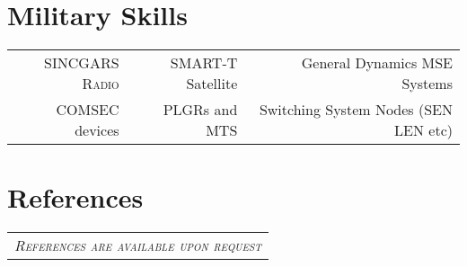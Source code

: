 \documentclass[a4paper,10pt]{article}
\newcommand{\fivenotes}{%
\textcolor{noteone}{\symbol{"2022}}
\textcolor{notetwo}{\symbol{"2022}}
\textcolor{notethree}{\symbol{"2022}}
\textcolor{notefour}{\symbol{"2022}}
\textcolor{notefive}{\symbol{"2022}}
}
\newcommand{\fournotes}{%
\textcolor{noteone}{\symbol{"2022}}
\textcolor{notetwo}{\symbol{"2022}}
\textcolor{notethree}{\symbol{"2022}}
\textcolor{notefour}{\symbol{"2022}}
\textcolor{white}{\symbol{"2022}}
}
\newcommand{\threenotes}{%
\textcolor{noteone}{\symbol{"2022}}
\textcolor{notetwo}{\symbol{"2022}}
\textcolor{notethree}{\symbol{"2022}}
\textcolor{white}{\symbol{"2022}}
\textcolor{white}{\symbol{"2022}}
}
\begin{document}
\section{\textbf{Military Skills}}
\begin{tabular}{r|r|r }
  \textsc{SINCGARS Radio}\small\emph{\fivenotes} &
  SMART-T Satellite \small\emph{\fournotes} &
  General Dynamics MSE Systems\small\emph{\fournotes} \\
  COMSEC devices\small\emph{\fournotes} &
  PLGRs and MTS \small\emph{\threenotes} &
  Switching System Nodes (SEN LEN etc) \small\emph{\threenotes}
\end{tabular}

\section{\textbf{References}}
\begin{tabular}{p{15.5cm}}
  \textsc{\emph{References are available upon request}}
\end{tabular}
\end{document}
